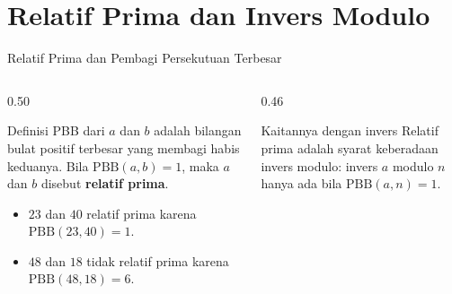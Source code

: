 \documentclass[aspectratio=169,11pt]{beamer}
\begin{document}
\section{Relatif Prima dan Invers Modulo}

\begin{frame}{Relatif Prima dan Pembagi Persekutuan Terbesar}
    \begin{columns}[T,onlytextwidth]
        \begin{column}{0.50\textwidth}
            \begin{block}{Definisi}
                PBB dari $a$ dan $b$ adalah bilangan bulat positif terbesar
                yang membagi habis keduanya. Bila $\text{PBB}(a,b) = 1$, maka
                $a$ dan $b$ disebut \textbf{relatif prima}.
            \end{block}
            \begin{itemize}
                \item $23$ dan $40$ relatif prima karena
                      $\text{PBB}(23,40) = 1$.
                \item $48$ dan $18$ tidak relatif prima karena
                      $\text{PBB}(48,18) = 6$.
            \end{itemize}
        \end{column}
        \begin{column}{0.46\textwidth}
            \begin{alertblock}{Kaitannya dengan invers}
                Relatif prima adalah syarat keberadaan invers modulo: invers
                $a$ modulo $n$ hanya ada bila $\text{PBB}(a,n) = 1$.
            \end{alertblock}
        \end{column}
    \end{columns}
\end{frame}
\end{document}
